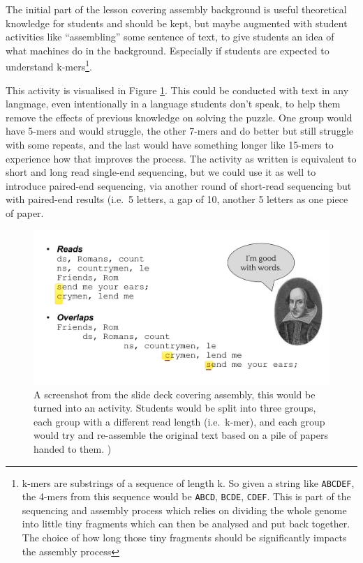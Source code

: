 \documentclass[paper=a4,justified,a4paper]{tufte-handout}
\begin{document}
The initial part of the lesson covering assembly background is useful
theoretical knowledge for students and should be kept, but maybe
augmented with student activities like ``assembling'' some sentence of
text, to give students an idea of what machines do in the background.
Especially if students are expected to understand k-mers\footnote{k-mers
  are substrings of a sequence of length k. So given a string like
  \texttt{ABCDEF}, the 4-mers from this sequence would be \texttt{ABCD},
  \texttt{BCDE}, \texttt{CDEF}. This is part of the sequencing and
  assembly process which relies on dividing the whole genome into little
  tiny fragments which can then be analysed and put back together. The
  choice of how long those tiny fragments should be significantly
  impacts the assembly process}.

This activity is visualised in Figure \ref{fig:activity}. This could be
conducted with text in any langmage, even intentionally in a language
students don't speak, to help them remove the effects of previous
knowledge on solving the puzzle. One group would have 5-mers and would
struggle, the other 7-mers and do better but still struggle with some
repeats, and the last would have something longer like 15-mers to
experience how that improves the process. The activity as written is
equivalent to short and long read single-end sequencing, but we could
use it as well to introduce paired-end sequencing, via another round of
short-read sequencing but with paired-end results (i.e.~5 letters, a gap
of 10, another 5 letters as one piece of paper.

\begin{figure}
\centering
\includegraphics{./activity.png}
\caption{A screenshot from the slide deck covering assembly, this would
be turned into an activity. Students would be split into three groups,
each group with a different read length (i.e.~k-mer), and each group
would try and re-assemble the original text based on a pile of papers
handed to them. )\label{fig:activity}}
\end{figure}
\end{document}
